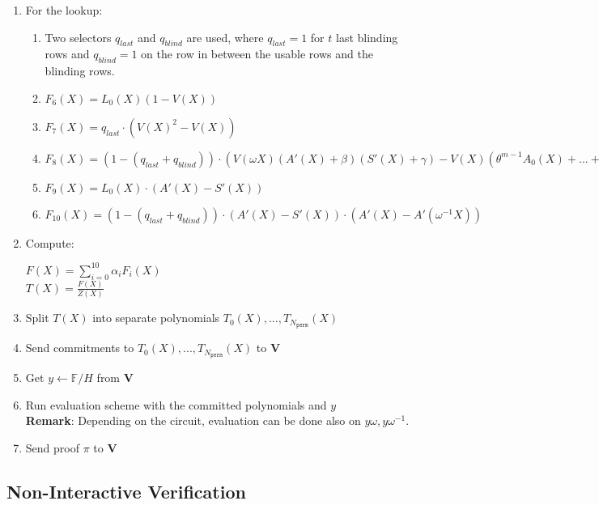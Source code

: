 \begin{enumerate}
	\item For the lookup:
	\begin{enumerate}
		\item Two selectors $q_{last}$ and $q_{blind}$ are used, where $q_{last} = 1$ for $t$ last blinding rows and $q_{blind} = 1$ on the row in between the usable rows and the blinding rows.
		\item $F_6(X) = L_0(X) (1 - V(X))$
		\item $F_7(X) = q_{last} \cdot (V(X)^2 - V(X))$
		\item $F_8(X) = (1 - (q_{last} + q_{blind})) \cdot ( V(\omega X) (A'(X) + \beta) (S'(X) + \gamma) - V(X) (\theta^{m-1} A_0(X) + ... + A_{m-1}(X) + \beta) (\theta^{m-1} S_0(X) + ... + S_{m-1}(X) + \gamma) )$
		\item $F_9(X) = L_0(X) \cdot (A'(X) - S'(X))$
		\item $F_{10}(X) = (1 - (q_{last} + q_{blind})) \cdot (A'(X) - S'(X))\cdot(A'(X) - A'(\omega^{-1} X))$
	\end{enumerate}
	\item Compute:
	\begin{center}
		$F(X) = \sum\limits_{i = 0}^{10} \alpha_iF_i(X)$ \\
		$T(X) = \frac{F(X)}{Z(X)}$
	\end{center}
	\item Split $T(X)$ into separate polynomials $T_0(X), ..., T_{N_{\texttt{perm}}}(X)$
	\item Send commitments to $T_0(X), ..., T_{N_{\texttt{perm}}}(X)$ to \textbf{V}
	\item Get $y \leftarrow \mathbb{F}/H$ from \textbf{V}
	\item Run evaluation scheme with the committed polynomials and $y$ \\
	\textbf{Remark}: Depending on the circuit, evaluation can be done also on $y\omega, y\omega^{-1}$.
	\item Send proof $\pi$ to $\textbf{V}$
\end{enumerate}

\subsection{Non-Interactive Verification}

